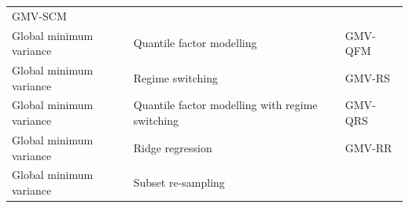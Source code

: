 \documentclass[
]{article}
\begin{document}
\begin{longtable}[]{@{}lll@{}}
\begin{minipage}[t]{0.15\columnwidth}
GMV-SCM\strut
\end{minipage}\tabularnewline
\begin{minipage}[t]{0.26\columnwidth}\raggedright
Global minimum variance\strut
\end{minipage} & \begin{minipage}[t]{0.51\columnwidth}\raggedright
Quantile factor modelling\strut
\end{minipage} & \begin{minipage}[t]{0.15\columnwidth}\raggedright
GMV-QFM\strut
\end{minipage}\tabularnewline
\begin{minipage}[t]{0.26\columnwidth}\raggedright
Global minimum variance\strut
\end{minipage} & \begin{minipage}[t]{0.51\columnwidth}\raggedright
Regime switching\strut
\end{minipage} & \begin{minipage}[t]{0.15\columnwidth}\raggedright
GMV-RS\strut
\end{minipage}\tabularnewline
\begin{minipage}[t]{0.26\columnwidth}\raggedright
Global minimum variance\strut
\end{minipage} & \begin{minipage}[t]{0.51\columnwidth}\raggedright
Quantile factor modelling with regime switching\strut
\end{minipage} & \begin{minipage}[t]{0.15\columnwidth}\raggedright
GMV-QRS\strut
\end{minipage}\tabularnewline
\begin{minipage}[t]{0.26\columnwidth}\raggedright
Global minimum variance\strut
\end{minipage} & \begin{minipage}[t]{0.51\columnwidth}\raggedright
Ridge regression\strut
\end{minipage} & \begin{minipage}[t]{0.15\columnwidth}\raggedright
GMV-RR\strut
\end{minipage}\tabularnewline
\begin{minipage}[t]{0.26\columnwidth}\raggedright
Global minimum variance\strut
\end{minipage} & \begin{minipage}[t]{0.51\columnwidth}\raggedright
Subset re-sampling\strut
\end{minipage} & \begin{minipage}[t]{0.15\columnwidth}\raggedright

\end{minipage}
\end{longtable}
\end{document}
